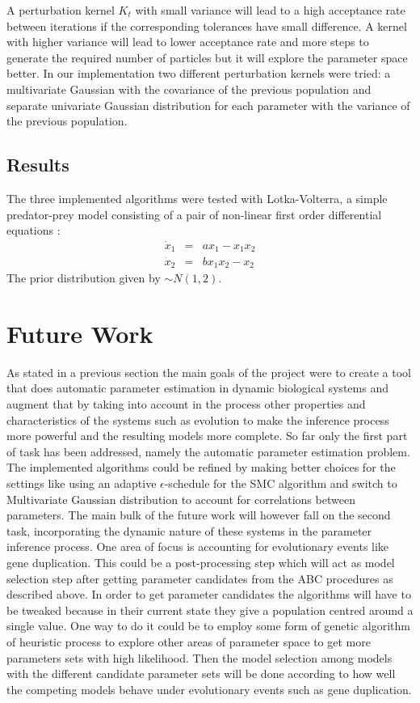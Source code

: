 \documentclass[12pt,a4paper,titlepage]{article}
\begin{document}
 A perturbation kernel $K_{t}$ with small variance will lead to a high acceptance rate between iterations if the corresponding tolerances have small difference. A kernel with higher variance will lead to lower acceptance rate and more steps to generate the required number of particles but it will explore the parameter space better\cite{filippi2011optimal}.  In our implementation two different perturbation kernels were tried: a multivariate Gaussian with the covariance of the previous population and separate univariate Gaussian distribution for each parameter with the variance of the previous population.
\subsection{Results}
The three implemented algorithms were tested with Lotka-Volterra\cite{lotka1925elements}, a simple predator-prey model consisting of a pair of non-linear first order differential equations :
\begin{eqnarray*}
\dot x_{1} & = & ax_{1} - x_{1} x_{2}\\
\dot x_{2} & =& b x_{1}x_{2} - x_{2}
\end{eqnarray*}
The prior distribution given by $\sim N(1,2)$.
\section{Future Work}
As stated in a previous section the main goals of the project were to create a tool that does automatic parameter estimation in dynamic biological systems and augment that by taking into account in the process other properties and characteristics of the systems such as evolution to make the inference process more powerful and the resulting models more complete. So far only the first part of task has been addressed, namely the automatic parameter estimation problem. The implemented algorithms could be refined by making better choices for the settings like using an adaptive $\epsilon$-schedule for the SMC algorithm and switch to Multivariate Gaussian distribution to account for correlations between parameters. 	The main bulk of the future work will however fall on the second task, incorporating the dynamic nature of these systems in the parameter inference process. One area of focus is accounting for evolutionary events like gene duplication. This could be a post-processing step which will act as model selection step after getting parameter candidates from the ABC procedures as described above. In order to get parameter candidates the algorithms will have to be tweaked because in their current state they give a population centred around a single value. One way to do it could be to employ some form of genetic algorithm of heuristic process to explore other areas of parameter space to get more parameters sets with high  likelihood. Then the model selection among models with the different candidate parameter sets will be done according to how well the competing models behave under evolutionary events such as gene duplication.

\end{document}

